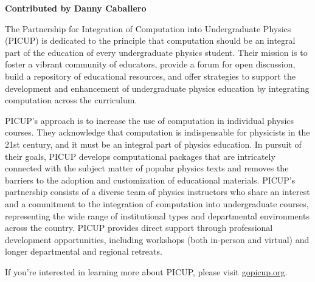 \textbf{Contributed by Danny Caballero}

The Partnership for Integration of Computation into Undergraduate Physics (PICUP) is dedicated to the principle that computation should be an integral part of the education of every undergraduate physics student. Their mission is to foster a vibrant community of educators, provide a forum for open discussion, build a repository of educational resources, and offer strategies to support the development and enhancement of undergraduate physics education by integrating computation across the curriculum.

PICUP's approach is to increase the use of computation in individual physics courses. They acknowledge that computation is indispensable for physicists in the 21st century, and it must be an integral part of physics education. In pursuit of their goals, PICUP develops computational packages that are intricately connected with the subject matter of popular physics texts and removes the barriers to the adoption and customization of educational materials. PICUP's partnership consists of a diverse team of physics instructors who share an interest and a commitment to the integration of computation into undergraduate courses, representing the wide range of institutional types and departmental environments across the country. PICUP provides direct support through professional development opportunities, including workshops (both in-person and virtual) and longer departmental and regional retreats. 

If you're interested in learning more about PICUP, please visit \href{https://gopicup.org}{gopicup.org}.